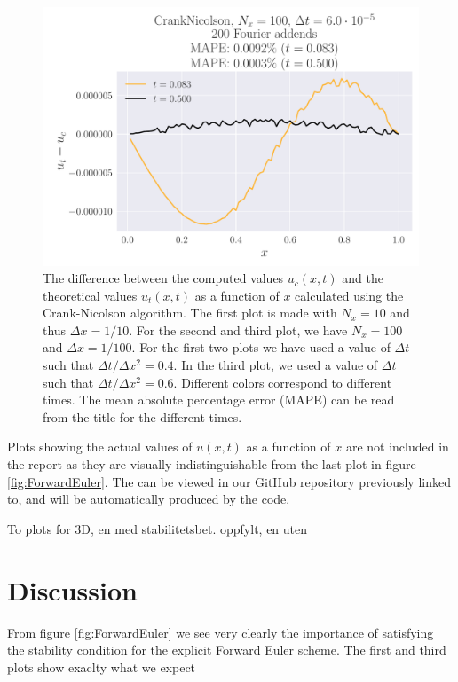 \documentclass[reprint, english,notitlepage,nofootinbib]{revtex4-1}  %
\begin{document}
\begin{figure}
  \includegraphics[width=\linewidth]{CrankNicolson-Nt8333-dt6_0e-05-Nx100-Error.pdf}
  \caption{The difference between the computed values \(u_c(x, t)\) and the theoretical values \(u_t(x, t)\) as a function of \(x\) calculated using the Crank-Nicolson algorithm. The first plot is made with \(N_x = 10\) and thus \(\Delta x = 1/10\). For the second and third plot, we have \(N_x = 100\) and \(\Delta x = 1/100\). For the first two plots we have used a value of \(\Delta t\) such that \(\Delta t / \Delta x^2 = 0.4\). In the third plot, we used a value of \(\Delta t\) such that \(\Delta t / \Delta x^2 = 0.6\). Different colors correspond to different times. The mean absolute percentage error (MAPE) can be read from the title for the different times.}
  \label{fig:CrankNicolson}
\end{figure}

Plots showing the actual values of \(u(x, t)\) as a function of \(x\) are not included in the report as they are visually indistinguishable from the last plot in figure \ref{fig:ForwardEuler}. The can be viewed in our GitHub repository previously linked to, and will be automatically produced by the code.

To plots for 3D, en med stabilitetsbet. oppfylt, en uten



\section{Discussion}

From figure \ref{fig:ForwardEuler} we see very clearly the importance of satisfying the stability condition for the explicit Forward Euler scheme. The first and third plots show exaclty what we expect
\end{document}
